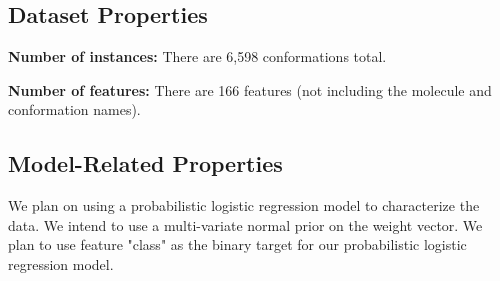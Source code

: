 \documentclass[12pt]{article}
\begin{document}
\subsection{Dataset Properties}

\textbf{Number of instances:} There are 6,598 conformations total.

\textbf{Number of features:} There are 166 features (not including the molecule and conformation names).

\subsection{Model-Related Properties}

We plan on using  a probabilistic logistic regression model to characterize the data. We intend to use a multi-variate normal prior on the weight vector. We plan to use feature "class" as the binary target for our probabilistic logistic regression model.
\end{document}
